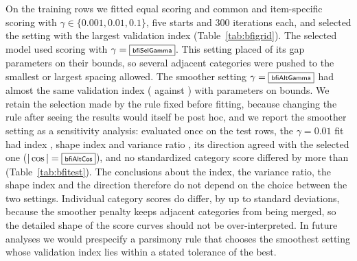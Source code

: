 On the training rows we fitted equal scoring and common and item-specific scoring with $\gamma\in\{0.001,0.01,0.1\}$, five starts and 300 iterations each, and selected the setting with the largest validation index (Table~\ref{tab:bfigrid}). The selected model used \bfiSelScoring{} scoring with $\gamma=\fbox{\scriptsize\textsf{bfiSelGamma}}$. This setting placed \bfiSelBounds{} of its \bfiNgap{} gap parameters on their bounds, so several adjacent categories were pushed to the smallest or largest spacing allowed. The smoother setting $\gamma=\fbox{\scriptsize\textsf{bfiAltGamma}}$ had almost the same validation index (\bfiAltValid{} against \bfiSelValid{}) with \bfiAltBounds{} parameters on bounds. We retain the selection made by the rule fixed before fitting, because changing the rule after seeing the results would itself be post hoc, and we report the smoother setting as a sensitivity analysis: evaluated once on the test rows, the $\gamma=0.01$ fit had index \bfiAltTest{}, shape index \bfiAltShape{} and variance ratio \bfiAltVarRatio{}, its direction agreed with the selected one ($|\cos|=\fbox{\scriptsize\textsf{bfiAltCos}}$), and no standardized category score differed by more than \bfiAltScoreDiff{} (Table~\ref{tab:bfitest}). The conclusions about the index, the variance ratio, the shape index and the direction therefore do not depend on the choice between the two settings. Individual category scores do differ, by up to \bfiAltScoreDiff{} standard deviations, because the smoother penalty keeps adjacent categories from being merged, so the detailed shape of the score curves should not be over-interpreted. In future analyses we would prespecify a parsimony rule that chooses the smoothest setting whose validation index lies within a stated tolerance of the best.

\begin{table}[htbp]
\centering\small
{}
\caption{Candidate settings for the neuroticism items, fitted on training rows and compared on validation rows. Roughness is $R(s)$; ``On bounds'' counts gap parameters at $\pm3$.}
\label{tab:bfigrid}
\end{table}

